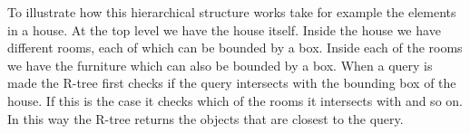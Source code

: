To illustrate how this hierarchical structure works take for example the  elements in a house. At the top level we have the house itself. Inside the house we have different rooms, each of which can be bounded by a box. Inside each of the rooms we have the furniture which can also be bounded by a box. When a query is made the R-tree first checks if the query intersects with the bounding box of the house. If this is the case it checks which of the rooms it intersects with and so on. In this way the R-tree returns the objects that are closest to the query. 
















